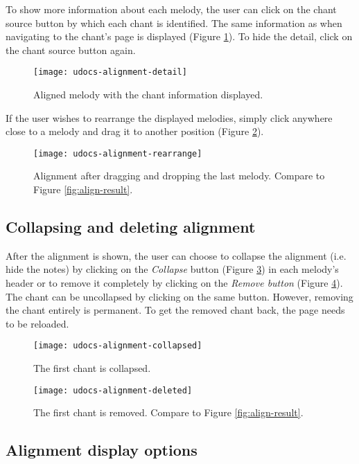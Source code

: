 To show more information about each melody, the user can click on the chant source button by which each chant is identified. The same information as when navigating
to the chant's page is displayed (Figure \ref{fig:align-detail}). To hide the detail, click on the chant source button again.

\begin{figure}[!h]
\centering
\texttt{[image: udocs-alignment-detail]}
\caption{Aligned melody with the chant information displayed.}
\label{fig:align-detail}
\end{figure}

If the user wishes to rearrange the displayed melodies, simply click anywhere close to a melody and drag it to another position (Figure \ref{fig:align-rearrange}).

\begin{figure}[!h]
\centering
\texttt{[image: udocs-alignment-rearrange]}
\caption{Alignment after dragging and dropping the last melody. Compare to Figure \ref{fig:align-result}.}
\label{fig:align-rearrange}
\end{figure}

\subsection{Collapsing and deleting alignment}

After the alignment is shown, the user can choose to collapse the alignment (i.e. hide the notes) by clicking on the \emph{Collapse} button (Figure \ref{fig:align-collapsed})
in each melody's header or to remove it completely by clicking on the \emph{Remove button} (Figure \ref{fig:align-removed}). The chant can be uncollapsed by clicking
on the same button. However, removing the chant entirely is permanent. To get the removed chant back, the page needs to be reloaded.

\begin{figure}[!h]
\centering
\texttt{[image: udocs-alignment-collapsed]}
\caption{The first chant is collapsed.}
\label{fig:align-collapsed}
\end{figure}

\begin{figure}[!h]
\centering
\texttt{[image: udocs-alignment-deleted]}
\caption{The first chant is removed. Compare to Figure \ref{fig:align-result}.}
\label{fig:align-removed}
\end{figure}

\subsection{Alignment display options}

